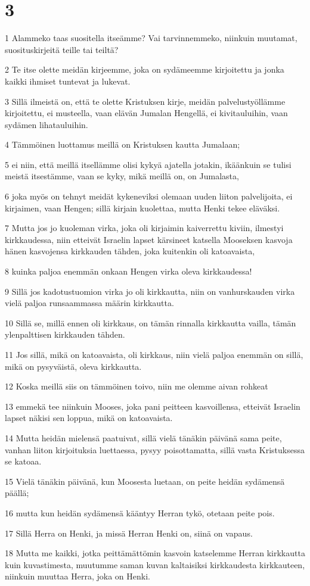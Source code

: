 \chapter{3}

\par 1 Alammeko taas suositella itseämme? Vai tarvinnemmeko, niinkuin muutamat, suosituskirjeitä teille tai teiltä?
\par 2 Te itse olette meidän kirjeemme, joka on sydämeemme kirjoitettu ja jonka kaikki ihmiset tuntevat ja lukevat.
\par 3 Sillä ilmeistä on, että te olette Kristuksen kirje, meidän palvelustyöllämme kirjoitettu, ei musteella, vaan elävän Jumalan Hengellä, ei kivitauluihin, vaan sydämen lihatauluihin.
\par 4 Tämmöinen luottamus meillä on Kristuksen kautta Jumalaan;
\par 5 ei niin, että meillä itsellämme olisi kykyä ajatella jotakin, ikäänkuin se tulisi meistä itsestämme, vaan se kyky, mikä meillä on, on Jumalasta,
\par 6 joka myös on tehnyt meidät kykeneviksi olemaan uuden liiton palvelijoita, ei kirjaimen, vaan Hengen; sillä kirjain kuolettaa, mutta Henki tekee eläväksi.
\par 7 Mutta jos jo kuoleman virka, joka oli kirjaimin kaiverrettu kiviin, ilmestyi kirkkaudessa, niin etteivät Israelin lapset kärsineet katsella Mooseksen kasvoja hänen kasvojensa kirkkauden tähden, joka kuitenkin oli katoavaista,
\par 8 kuinka paljoa enemmän onkaan Hengen virka oleva kirkkaudessa!
\par 9 Sillä jos kadotustuomion virka jo oli kirkkautta, niin on vanhurskauden virka vielä paljoa runsaammassa määrin kirkkautta.
\par 10 Sillä se, millä ennen oli kirkkaus, on tämän rinnalla kirkkautta vailla, tämän ylenpalttisen kirkkauden tähden.
\par 11 Jos sillä, mikä on katoavaista, oli kirkkaus, niin vielä paljoa enemmän on sillä, mikä on pysyväistä, oleva kirkkautta.
\par 12 Koska meillä siis on tämmöinen toivo, niin me olemme aivan rohkeat
\par 13 emmekä tee niinkuin Mooses, joka pani peitteen kasvoillensa, etteivät Israelin lapset näkisi sen loppua, mikä on katoavaista.
\par 14 Mutta heidän mielensä paatuivat, sillä vielä tänäkin päivänä sama peite, vanhan liiton kirjoituksia luettaessa, pysyy poisottamatta, sillä vasta Kristuksessa se katoaa.
\par 15 Vielä tänäkin päivänä, kun Moosesta luetaan, on peite heidän sydämensä päällä;
\par 16 mutta kun heidän sydämensä kääntyy Herran tykö, otetaan peite pois.
\par 17 Sillä Herra on Henki, ja missä Herran Henki on, siinä on vapaus.
\par 18 Mutta me kaikki, jotka peittämättömin kasvoin katselemme Herran kirkkautta kuin kuvastimesta, muutumme saman kuvan kaltaisiksi kirkkaudesta kirkkauteen, niinkuin muuttaa Herra, joka on Henki.

